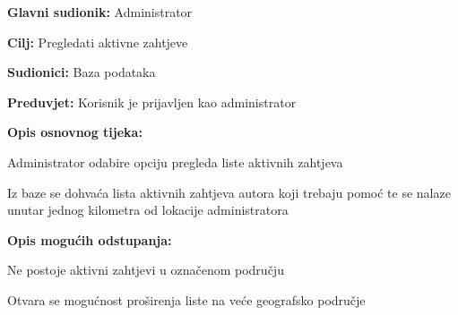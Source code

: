 \noindent {}
\begin{packed_item}
	\item \textbf{Glavni sudionik: }Administrator
	\item  \textbf{Cilj:} Pregledati aktivne zahtjeve
	\item  \textbf{Sudionici:} Baza podataka
	\item  \textbf{Preduvjet:} Korisnik je prijavljen kao administrator
	\item  \textbf{Opis osnovnog tijeka:}
	\item[] \begin{packed_enum}
		\item Administrator odabire opciju pregleda liste aktivnih zahtjeva
		\item Iz baze se dohvaća lista aktivnih zahtjeva autora koji trebaju pomoć te se nalaze unutar jednog kilometra od lokacije administratora
	\end{packed_enum}
	\item  \textbf{Opis mogućih odstupanja:}
	\item[] \begin{packed_item}
		\item[2.a] Ne postoje aktivni zahtjevi u označenom području
		\item[] \begin{packed_enum}
			\item Otvara se mogućnost proširenja liste na veće geografsko područje
		\end{packed_enum}
	\end{packed_item}
\end{packed_item}


